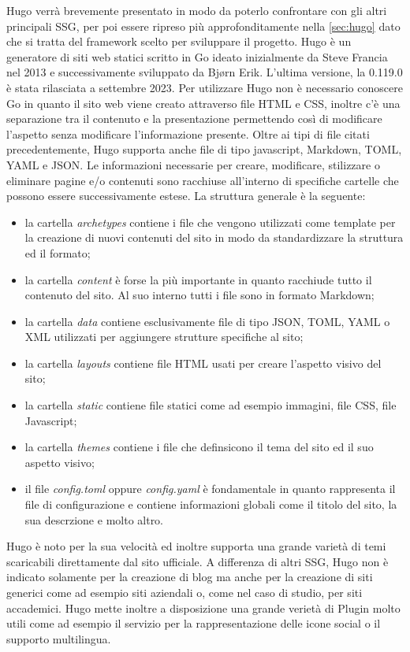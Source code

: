\documentclass[target=bach,aauheader=]{thud}
\begin{document}
Hugo verrà brevemente presentato in modo da poterlo confrontare con gli altri principali SSG, per poi essere ripreso più approfonditamente nella \cref{sec:hugo} dato che si tratta del framework scelto per sviluppare il progetto. \newline
Hugo è un generatore di siti web statici scritto in Go ideato inizialmente da Steve Francia nel 2013 e successivamente sviluppato da Bjørn Erik. L'ultima versione, la 0.119.0 è stata rilasciata a settembre 2023.
Per utilizzare Hugo non è necessario conoscere Go in quanto il sito web viene creato attraverso file HTML e CSS, inoltre c'è una separazione tra il contenuto e la presentazione permettendo così di modificare l'aspetto senza modificare l'informazione presente. 
Oltre ai tipi di file citati precedentemente, Hugo supporta anche file di tipo javascript, Markdown, TOML, YAML e JSON. \newline
Le informazioni necessarie per creare, modificare, stilizzare o eliminare pagine e/o contenuti sono racchiuse all'interno di specifiche cartelle che possono essere successivamente estese. La struttura generale è la seguente:
\begin{itemize}
    \item la cartella \textit{archetypes} contiene i file che vengono utilizzati come template per la creazione di nuovi contenuti del sito in modo da standardizzare la struttura ed il formato;
    \item la cartella \textit{content} è forse la più importante in quanto racchiude tutto il contenuto del sito. Al suo interno tutti i file sono in formato Markdown;
    \item la cartella \textit{data} contiene esclusivamente file di tipo JSON, TOML, YAML o XML utilizzati per aggiungere strutture specifiche al sito;
    \item la cartella \textit{layouts} contiene file HTML usati per creare l'aspetto visivo del sito;
    \item la cartella \textit{static} contiene file statici come ad esempio immagini, file CSS, file Javascript;
    \item la cartella \textit{themes} contiene i file che definsicono il tema del sito ed il suo aspetto visivo;
    \item il file \textit{config.toml} oppure \textit{config.yaml} è fondamentale in quanto rappresenta il file di configurazione e contiene informazioni globali come il titolo del sito, la sua descrzione e molto altro.
\end{itemize}
Hugo è noto per la sua velocità ed inoltre supporta una grande varietà di temi scaricabili direttamente dal sito ufficiale. A differenza di altri SSG, Hugo non è indicato solamente per la creazione di blog
ma anche per la creazione di siti generici come ad esempio siti aziendali o, come nel caso di studio, per siti accademici. 
Hugo mette inoltre a disposizione una grande verietà di Plugin molto utili come ad esempio il servizio per la rappresentazione delle icone social o il supporto multilingua. 
\end{document}
